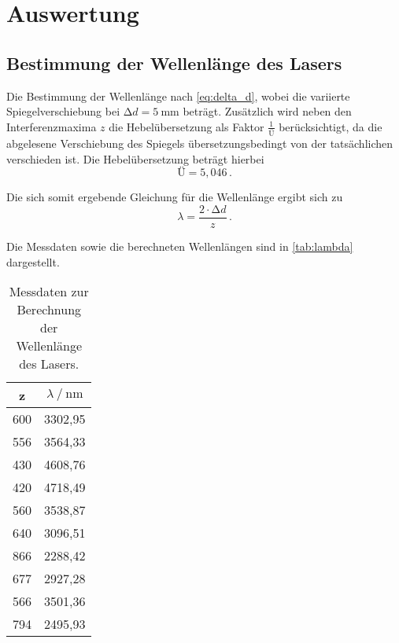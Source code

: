 \section{Auswertung}
\label{sec:Auswertung}

\subsection{Bestimmung der Wellenlänge des Lasers}

Die Bestimmung der Wellenlänge nach \autoref{eq:delta_d}, 
wobei die variierte Spiegelverschiebung bei $\increment d = \qty{5}{\milli\meter}$ beträgt.
Zusätzlich wird neben den Interferenzmaxima $z$ die Hebelübersetzung als Faktor $\frac{1}{Ü}$ berücksichtigt,
da die abgelesene Verschiebung des Spiegels übersetzungsbedingt von der tatsächlichen verschieden ist.
Die Hebelübersetzung beträgt hierbei 
\begin{equation*}
    \text{Ü} = 5,046 \, .
\end{equation*}

Die sich somit ergebende Gleichung für die Wellenlänge ergibt sich zu
\begin{equation} \label{eq:lambda}
    \lambda = \frac{2 \cdot \increment d}{z} \, .
\end{equation}

Die Messdaten sowie die berechneten Wellenlängen sind in \autoref{tab:lambda} dargestellt.
\begin{table}
    \centering
    \caption{Messdaten zur Berechnung der Wellenlänge des Lasers.}
    \label{tab:lambda}
    \begin{tabular}{c c}
        \toprule
        z &  $\lambda \mathbin{/} \mathrm{nm}$ \\
        \midrule
        600 & 3302,95 \\
        556 & 3564,33 \\
        430 & 4608,76 \\
        420 & 4718,49 \\
        560 & 3538,87 \\
        640 & 3096,51 \\
        866 & 2288,42 \\
        677 & 2927,28 \\
        566 & 3501,36 \\
        794 & 2495,93 \\
        \bottomrule
    \end{tabular}
\end{table}


